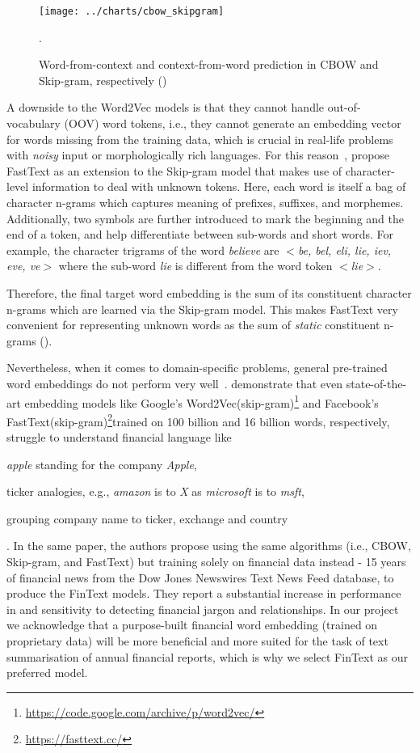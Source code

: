 \begin{figure}[ht]
    \centering
    \texttt{[image: ../charts/cbow\_skipgram]}~\caption{Word-from-context and context-from-word prediction in CBOW and Skip-gram, respectively (\cite{mikolov2013efficient})}.
    \label{fig:cbow_skipgram}
\end{figure}

A downside to the Word2Vec models is that they cannot handle out-of-vocabulary (OOV) word tokens, i.e., they cannot generate an embedding vector for words missing from the training data, which is crucial in real-life problems with \emph{noisy} input or morphologically rich languages.
For this reason~\cite{bojanowski-etal-2017-enriching}, propose FastText as an extension to the Skip-gram model that makes use of character-level information to deal with unknown tokens.
Here, each word is itself a bag of character n-grams which captures meaning of prefixes, suffixes, and morphemes. 
Additionally, two symbols are further introduced to mark the beginning and the end of a token, and help differentiate between sub-words and short words.
For example, the character trigrams of the word \emph{believe} are \emph{$<$be, bel, eli, lie, iev, eve, ve$>$} where the sub-word \emph{lie} is different from the word token \emph{$<$lie$>$}.

Therefore, the final target word embedding is the sum of its constituent character n-grams which are learned via the Skip-gram model.
This makes FastText very convenient for representing unknown words as the sum of \emph{static} constituent n-grams (\cite{jurafsky2000}).

Nevertheless, when it comes to domain-specific problems, general pre-trained word embeddings do not perform very well~\cite{rahimikia2021realised}.
demonstrate that even state-of-the-art embedding models like Google's Word2Vec(skip-gram)\footnote{\url{https://code.google.com/archive/p/word2vec/}} and Facebook’s FastText(skip-gram)\footnote{\url{https://fasttext.cc/}}trained on 100 billion and 16 billion words, respectively, struggle to understand financial language like \begin{enumerate*}
    \item \emph{apple} standing for the company \emph{Apple},
    \item ticker analogies, e.g., \emph{amazon} is to \emph{X} as \emph{microsoft} is to \emph{msft},
    \item grouping company name to ticker, exchange and country
\end{enumerate*}.
In the same paper, the authors propose using the same algorithms (i.e., CBOW, Skip-gram, and FastText) but training solely on financial data instead - 15 years of financial news from the Dow Jones Newswires Text News Feed database, to produce the FinText models.
They report a substantial increase in performance in and sensitivity to detecting financial jargon and relationships.
In our project we acknowledge that a purpose-built financial word embedding (trained on proprietary data) will be more beneficial and more suited for the task of text summarisation of annual financial reports, which is why we select FinText as our preferred model.

